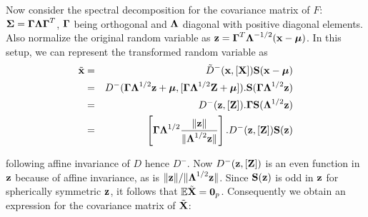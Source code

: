 Now consider the spectral decomposition for the covariance matrix of $F$: ${\boldsymbol{\Sigma}} = {\boldsymbol{\Gamma}}{\boldsymbol{\Lambda}}{\boldsymbol{\Gamma}}^T$, ${\boldsymbol{\Gamma}}$ being orthogonal and ${\boldsymbol{\Lambda}}$ diagonal with positive diagonal elements. Also normalize the original random variable as ${\bf{z}} = {\boldsymbol{\Gamma}}^T{\boldsymbol{\Lambda}}^{-1/2} ({\bf{x}} - {\boldsymbol{\mu}})$. In this setup, we can represent the transformed random variable as
%
\begin{eqnarray}
\tilde {{\bf{x}}} &=& \tilde D^- ({\bf{x}}, [{\mathbf{X}}]) {\mathbf{S}}({\bf{x}} - {\boldsymbol{\mu}}) \notag \\
&=& D^-  ({\boldsymbol{\Gamma}}{\boldsymbol{\Lambda}}^{1/2} {\bf{z}} + {\boldsymbol{\mu}}, [{\boldsymbol{\Gamma}}{\boldsymbol{\Lambda}}^{1/2}{\mathbf{Z}} + {\boldsymbol{\mu}} ]). {\mathbf{S}}({\boldsymbol{\Gamma}}{\boldsymbol{\Lambda}}^{1/2} {\bf{z}}) \notag \\
&=& D^-  ({\bf{z}}, [{\mathbf{Z}}]) .{\boldsymbol{\Gamma}} {\mathbf{S}}({\boldsymbol{\Lambda}}^{1/2}{\bf{z}}) \notag \\
&=& \left[ {\boldsymbol{\Gamma}} {\boldsymbol{\Lambda}}^{1/2} \frac{\| {\bf{z}} \|}{\|{\boldsymbol{\Lambda}}^{1/2} {\bf{z}}\|} \right]. D^-  ({\bf{z}}, [{\mathbf{Z}}]) {\mathbf{S}}({\bf{z}})
\label{equation:rankdecomp}
\end{eqnarray}
%

following affine invariance of $D$ hence $D^-$. Now $D^- ( {\bf{z}}, [\bf Z])$ is an even function in ${\bf{z}}$ because of affine invariance, as is $\| {\bf{z}} \| / \|{\boldsymbol{\Lambda}}^{1/2} {\bf{z}} \|$. Since ${\mathbf{S}}({\bf{z}})$ is odd in ${\bf{z}}$ for spherically symmetric ${\bf{z}}$, it follows that $ {\mathbb{E}} \tilde {{\mathbf{X}}} = {\bf 0}_p$. Consequently we obtain an expression for the covariance matrix of $\tilde {{\mathbf{X}}}$:

